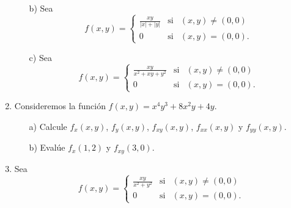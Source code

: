 \documentclass[12pt,legalpaper]{report}
\begin{document}
\begin{enumerate}
\begin{enumerate}
  \item[b)] Sea
    \begin{equation*}
      f(x,y)= \left\{ \begin{array}{lcc}
        \frac{xy}{|x|+|y|} & \text{si} & (x,y) \neq (0,0) \\
        0                  & \text{si} & (x,y)=(0,0).
      \end{array}
      \right.
    \end{equation*}


  \item[{\color{blue}c)}] Sea
    \begin{equation*}
      f(x,y)= \left\{ \begin{array}{lcc}
        \frac{xy}{x^{2}+xy+y^{2}} & \text{si} & (x,y) \neq (0,0) \\
        0                         & \text{si} & (x,y)=(0,0).
      \end{array}
      \right.
    \end{equation*}
\end{enumerate}

\item Consideremos la función $f(x,y)=x^{4}y^{3}+8x^{2}y+4y$.
\begin{enumerate}
  \item[a)] Calcule $f_{x}(x,y)$, $f_{y}(x,y)$, $f_{xy}(x,y)$, $f_{xx}(x,y)$ y $f_{yy}(x,y)$.
  \item[{\color{blue}b)}] Evalúe $f_{x}(1,2)$ y $f_{xy}(3,0)$.
\end{enumerate}

\item Sea
\begin{equation*}
  f(x,y)= \left\{ \begin{array}{lcc}
    \frac{xy}{x^{2}+y^{2}} & \text{si} & (x,y) \neq (0,0) \\
    0                      & \text{si} & (x,y)=(0,0).
  \end{array}
  \right.
\end{equation*}
\end{enumerate}
\end{document}
